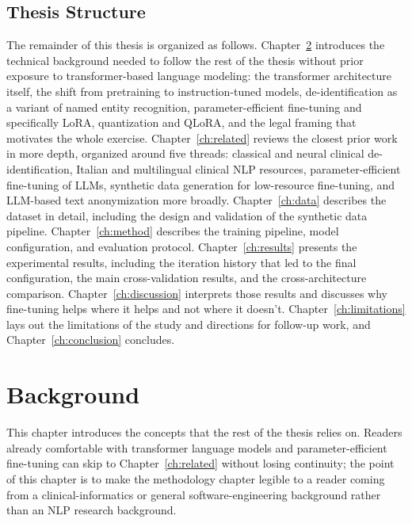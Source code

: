 \documentclass[12pt,a4paper]{report}
\begin{document}
\section{Thesis Structure}

The remainder of this thesis is organized as follows. Chapter~\ref{ch:background} introduces the technical background needed to follow the rest of the thesis without prior exposure to transformer-based language modeling: the transformer architecture itself, the shift from pretraining to instruction-tuned models, de-identification as a variant of named entity recognition, parameter-efficient fine-tuning and specifically LoRA, quantization and QLoRA, and the legal framing that motivates the whole exercise. Chapter~\ref{ch:related} reviews the closest prior work in more depth, organized around five threads: classical and neural clinical de-identification, Italian and multilingual clinical NLP resources, parameter-efficient fine-tuning of LLMs, synthetic data generation for low-resource fine-tuning, and LLM-based text anonymization more broadly. Chapter~\ref{ch:data} describes the dataset in detail, including the design and validation of the synthetic data pipeline. Chapter~\ref{ch:method} describes the training pipeline, model configuration, and evaluation protocol. Chapter~\ref{ch:results} presents the experimental results, including the iteration history that led to the final configuration, the main cross-validation results, and the cross-architecture comparison. Chapter~\ref{ch:discussion} interprets those results and discusses why fine-tuning helps where it helps and not where it doesn't. Chapter~\ref{ch:limitations} lays out the limitations of the study and directions for follow-up work, and Chapter~\ref{ch:conclusion} concludes.

\chapter{Background}
\label{ch:background}

This chapter introduces the concepts that the rest of the thesis relies on. Readers already comfortable with transformer language models and parameter-efficient fine-tuning can skip to Chapter~\ref{ch:related} without losing continuity; the point of this chapter is to make the methodology chapter legible to a reader coming from a clinical-informatics or general software-engineering background rather than an NLP research background.
\end{document}
